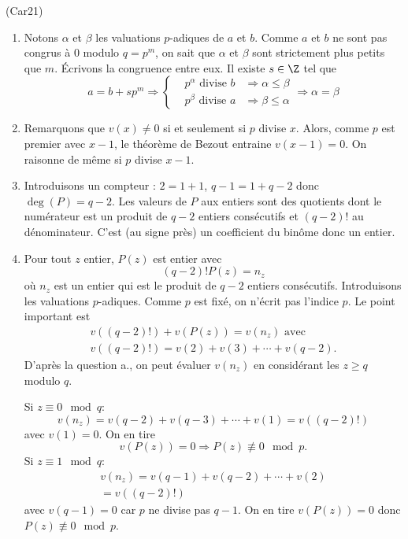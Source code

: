\begin{tiny}(Car21)\end{tiny}
\begin{enumerate}
  \item Notons $\alpha$ et $\beta$ les valuations $p$-adiques de $a$ et $b$. Comme $a$ et $b$ ne sont pas congrus à $0$ modulo $q=p^m$, on sait que $\alpha$ et $\beta$ sont strictement plus petits que $m$. \'Ecrivons la congruence entre eux. Il existe $s\in \Z$ tel que
\begin{displaymath}
  a = b + s p^m \Rightarrow 
\left\lbrace  
\begin{aligned}
  &p^\alpha \text{ divise } b &\Rightarrow \alpha \leq \beta \\
  &p^\beta \text{ divise } a &\Rightarrow  \beta \leq \alpha 
\end{aligned}
\right. \Rightarrow \alpha = \beta
\end{displaymath}

  \item Remarquons que $v(x)\neq 0$ si et seulement si $p$ divise $x$. Alors, comme $p$ est premier avec $x-1$, le théorème de Bezout entraine $v(x-1) = 0$. On raisonne de même si $p$ divise $x-1$.

  \item Introduisons un compteur : $2=1+1$, $q-1 = 1 +q-2$ donc $\deg(P) = q-2$. Les valeurs de $P$ aux entiers sont des quotients dont le numérateur est un produit de $q-2$ entiers consécutifs et $(q-2)!$ au dénominateur. C'est (au signe près) un coefficient du binôme donc un entier. 
  
  \item Pour tout $z$ entier, $P(z)$ est entier avec 
\[
(q-2)!P(z) = n_z 
\]
où $n_z$ est un entier qui est le produit de $q-2$ entiers consécutifs. Introduisons les valuations $p$-adiques. Comme $p$ est fixé, on n'écrit pas l'indice $p$. Le point important est
\begin{multline*}
  v((q-2)!) + v(P(z)) = v(n_z) \text{ avec }  \\
  v((q-2)!) = v(2) + v(3) + \cdots + v(q-2).
\end{multline*}
D'après la question a., on peut évaluer $v(n_z)$ en considérant les $z\geq q$ modulo $q$.

Si $z\equiv 0 \mod q$:
\begin{displaymath}
  v(n_z) = v(q-2) + v(q-3) + \cdots + v(1)
= v((q-2)!)
\end{displaymath}
avec $v(1)=0$. On en tire 
\[
v(P(z))=0 \Rightarrow P(z) \not\equiv 0 \mod p. 
\]
Si $z\equiv 1 \mod q$:
\begin{multline*}
  v(n_z) = v(q-1) + v(q-2) + \cdots + v(2)\\ = v((q-2)!)
\end{multline*}
avec $v(q-1)=0$ car $p$ ne divise pas $q-1$. On en tire $v(P(z))=0$ donc $P(z) \not\equiv 0 \mod p$.


\end{enumerate}
